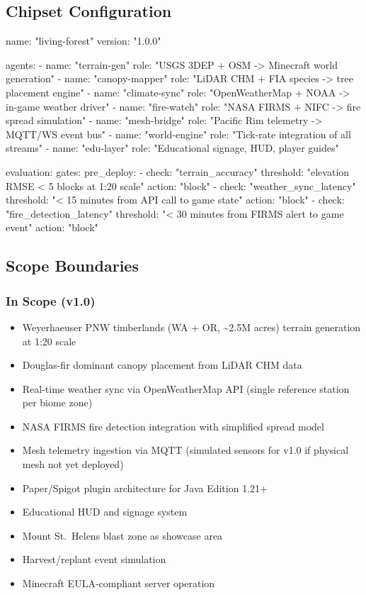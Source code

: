 \documentclass[11pt,letterpaper]{article}
\begin{document}
\subsection{Chipset Configuration}

\begin{asciibox}
name: "living-forest"
version: "1.0.0"

agents:
  - name: "terrain-gen"
    role: "USGS 3DEP + OSM -> Minecraft world generation"
  - name: "canopy-mapper"
    role: "LiDAR CHM + FIA species -> tree placement engine"
  - name: "climate-sync"
    role: "OpenWeatherMap + NOAA -> in-game weather driver"
  - name: "fire-watch"
    role: "NASA FIRMS + NIFC -> fire spread simulation"
  - name: "mesh-bridge"
    role: "Pacific Rim telemetry -> MQTT/WS event bus"
  - name: "world-engine"
    role: "Tick-rate integration of all streams"
  - name: "edu-layer"
    role: "Educational signage, HUD, player guides"

evaluation:
  gates:
    pre_deploy:
      - check: "terrain_accuracy"
        threshold: "elevation RMSE < 5 blocks at 1:20 scale"
        action: "block"
      - check: "weather_sync_latency"
        threshold: "< 15 minutes from API call to game state"
        action: "block"
      - check: "fire_detection_latency"
        threshold: "< 30 minutes from FIRMS alert to game event"
        action: "block"
\end{asciibox}

\subsection{Scope Boundaries}

\subsubsection*{In Scope (v1.0)}
\begin{itemize}[nosep]
  \item Weyerhaeuser PNW timberlands (WA + OR, \textasciitilde2.5M acres) terrain generation at 1:20 scale
  \item Douglas-fir dominant canopy placement from LiDAR CHM data
  \item Real-time weather sync via OpenWeatherMap API (single reference station per biome zone)
  \item NASA FIRMS fire detection integration with simplified spread model
  \item Mesh telemetry ingestion via MQTT (simulated sensors for v1.0 if physical mesh not yet deployed)
  \item Paper/Spigot plugin architecture for Java Edition 1.21+
  \item Educational HUD and signage system
  \item Mount St.\ Helens blast zone as showcase area
  \item Harvest/replant event simulation
  \item Minecraft EULA-compliant server operation
\end{itemize}
\end{document}
